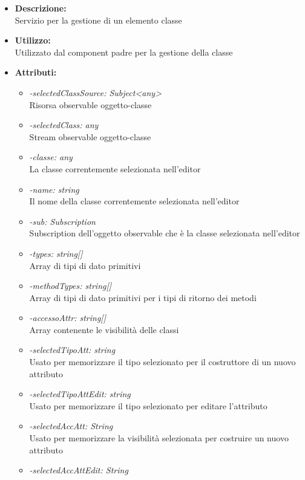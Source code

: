 \begin{itemize}
	\item \textbf{Descrizione:}\\
	Servizio per la gestione di un elemento classe
	\item \textbf{Utilizzo:}\\
	Utilizzato dal component padre per la gestione della classe
	
	\item \textbf{Attributi:}
		\begin{itemize}
			\item \emph{-selectedClassSource: Subject<any>}\\
			Risorsa observable oggetto-classe
			\item \emph{-selectedClass: any}\\
			Stream observable oggetto-classe
			\item \emph{-classe: any}\\
			La classe correntemente selezionata nell'editor
			\item \emph{-name: string}\\
			Il nome della classe correntemente selezionata nell'editor
			\item \emph{-sub: Subscription}\\
			Subscription dell'oggetto observable che è la classe selezionata nell'editor
			\item \emph{-types: string[]}\\
			Array di tipi di dato primitivi
			\item \emph{-methodTypes: string[]}\\
			Array di tipi di dato primitivi per i tipi di ritorno dei metodi
			\item \emph{-accessoAttr: string[]}\\
			Array contenente le visibilità delle classi
			\item \emph{-selectedTipoAtt: string}\\
			Usato per memorizzare il tipo selezionato per il costruttore di un nuovo attributo
			\item \emph{-selectedTipoAttEdit: string}\\
			Usato per memorizzare il tipo selezionato per editare l'attributo
			\item \emph{-selectedAccAtt: String}\\
			Usato per memorizzare la visibilità selezionata per costruire un nuovo attributo
			\item \emph{-selectedAccAttEdit: String}\\

\end{itemize}
\end{itemize}
